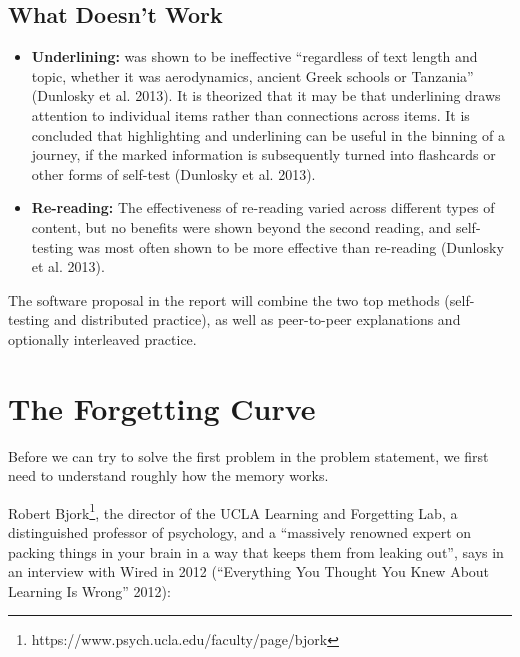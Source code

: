 \subsection{What Doesn't Work}\label{what-doesnt-work}

\begin{itemize}
\tightlist
\item
  \textbf{Underlining:} was shown to be ineffective ``regardless of text
  length and topic, whether it was aerodynamics, ancient Greek schools
  or Tanzania'' (Dunlosky et al. 2013). It is theorized that it may be
  that underlining draws attention to individual items rather than
  connections across items. It is concluded that highlighting and
  underlining can be useful in the binning of a journey, if the marked
  information is subsequently turned into flashcards or other forms of
  self-test (Dunlosky et al. 2013).
\item
  \textbf{Re-reading:} The effectiveness of re-reading varied across
  different types of content, but no benefits were shown beyond the
  second reading, and self-testing was most often shown to be more
  effective than re-reading (Dunlosky et al. 2013).
\end{itemize}

The software proposal in the report will combine the two top methods
(self-testing and distributed practice), as well as peer-to-peer
explanations and optionally interleaved practice.

\hypertarget{the-forgetting-curve}{\section{The Forgetting
Curve}\label{the-forgetting-curve}}

Before we can try to solve the first problem in the problem statement,
we first need to understand roughly how the memory works.

Robert Bjork\footnote{https://www.psych.ucla.edu/faculty/page/bjork},
the director of the UCLA Learning and Forgetting Lab, a distinguished
professor of psychology, and a ``massively renowned expert on packing
things in your brain in a way that keeps them from leaking out'', says
in an interview with Wired in 2012 (``Everything You Thought You Knew
About Learning Is Wrong'' 2012):

